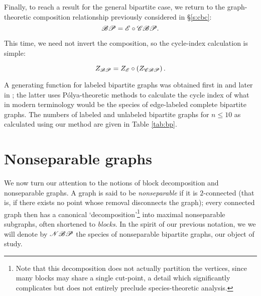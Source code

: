 \documentclass[sectionflow,singlespace,twoside,boldmathhdr]{brandiss} %
\numberwithin{section}{chapter}
\numberwithin{figure}{chapter}
\begin{document}
Finally, to reach a result for the general bipartite case, we return to the graph-theoretic composition relationship previously considered in \S \ref{s:cbc}:
\begin{equation*}
  \mathscr{BP} = \mathscr{E} \circ \mathscr{CBP}.
\end{equation*}

This time, we need not invert the composition, so the cycle-index calculation is simple:
\begin{theorem}
  \begin{equation}
    Z_{\mathscr{BP}} = Z_{\mathscr{E}} \circ \left( {Z_{\mathscr{CBP}}} \right).
  \end{equation}
\end{theorem}

A generating function for labeled bipartite graphs was obtained first in \cite{harprins:bipartite} and later in \cite{han:bipartite}; the latter uses P\'{o}lya-theoretic methods to calculate the cycle index of what in modern terminology would be the species of edge-labeled complete bipartite graphs.
The numbers of labeled and unlabeled bipartite graphs for $n \leq 10$ as calculated using our method are given in Table \ref{tab:bp}.

\section{Nonseparable graphs}\label{s:nbp}
We now turn our attention to the notions of block decomposition and nonseparable graphs.
A graph is said to be \emph{nonseparable} if it is $2$-connected (that is, if there exists no point whose removal disconnects the graph); every connected graph then has a canonical `decomposition'\footnote{Note that this decomposition does not actually partition the vertices, since many blocks may share a single cut-point, a detail which significantly complicates but does not entirely preclude species-theoretic analysis.} into maximal nonseparable subgraphs, often shortened to \emph{blocks}.
In the spirit of our previous notation, we we will denote by $\mathscr{NBP}$ the species of nonseparable bipartite graphs, our object of study.
\end{document}
